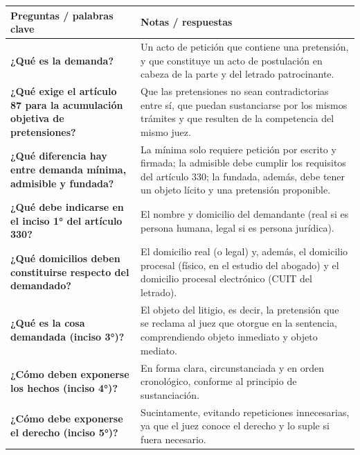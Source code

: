 \documentclass[12pt,oneside]{book}
\begin{document}
\begin{table}[H]
\centering
\small
\renewcommand{\arraystretch}{1.05}
\setlength{\parskip}{0.2em}
\begin{tabularx}{\textwidth}{
    >{\raggedright\arraybackslash}p{}
    >{\raggedright\arraybackslash}X
}
\toprule
\textbf{Preguntas / palabras clave} &
\textbf{Notas / respuestas} \\
\midrule

\textbf{¿Qué es la demanda?} &
Un acto de petición que contiene una pretensión, y que constituye un acto de postulación en cabeza de la parte y del letrado patrocinante. \\

\textbf{¿Qué exige el artículo 87 para la acumulación objetiva de pretensiones?} &
Que las pretensiones no sean contradictorias entre sí, que puedan sustanciarse por los mismos trámites y que resulten de la competencia del mismo juez. \\

\textbf{¿Qué diferencia hay entre demanda mínima, admisible y fundada?} &
La mínima solo requiere petición por escrito y firmada; la admisible debe cumplir los requisitos del artículo 330; la fundada, además, debe tener un objeto lícito y una pretensión proponible. \\

\textbf{¿Qué debe indicarse en el inciso 1° del artículo 330?} &
El nombre y domicilio del demandante (real si es persona humana, legal si es persona jurídica). \\

\textbf{¿Qué domicilios deben constituirse respecto del demandado?} &
El domicilio real (o legal) y, además, el domicilio procesal (físico, en el estudio del abogado) y el domicilio procesal electrónico (CUIT del letrado). \\

\textbf{¿Qué es la cosa demandada (inciso 3°)?} &
El objeto del litigio, es decir, la pretensión que se reclama al juez que otorgue en la sentencia, comprendiendo objeto inmediato y objeto mediato. \\

\textbf{¿Cómo deben exponerse los hechos (inciso 4°)?} &
En forma clara, circunstanciada y en orden cronológico, conforme al principio de sustanciación. \\

\textbf{¿Cómo debe exponerse el derecho (inciso 5°)?} &
Sucintamente, evitando repeticiones innecesarias, ya que el juez conoce el derecho y lo suple si fuera necesario. \\


\end{tabularx}
\end{table}
\end{document}
